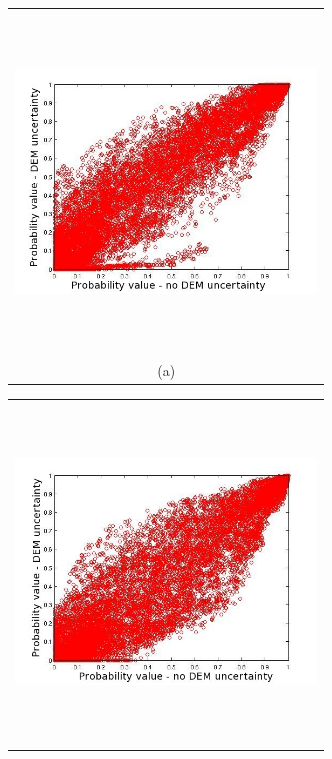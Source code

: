 \documentclass{article}
\newcommand{\Pic}[2][0.85]{\begin{center}\texttt{[image: \#2]}
 \end{center} }
\begin{document}
\begin{figure}[H]
      \begin{minipage}[b]{0.6\textwidth}
        \begin{tabular}{c}
       \includegraphics[width=8cm,height=9cm,keepaspectratio]{figs/Galeras_Aster_vs_meth0.jpg}\\
        (a)
        \end{tabular}
    \end{minipage}
    \begin{minipage}{0.6\textwidth}
        \begin{tabular}{c}
	\includegraphics[width=8cm,height=9cm,keepaspectratio]{figs/Galeras_Aster_vs_meth3.jpg}\\

\end{tabular}
\end{minipage}
\end{figure}
\end{document}
